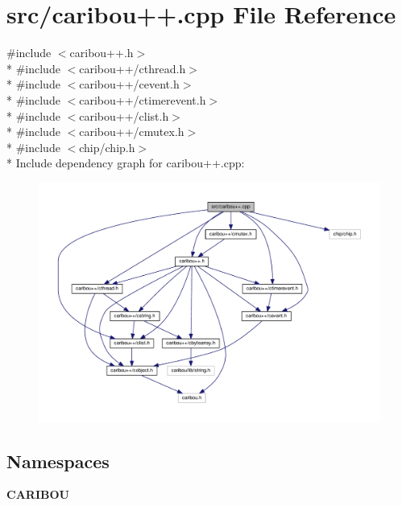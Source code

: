 \section{src/caribou++.cpp File Reference}
\label{caribou_09_09_8cpp}
{\ttfamily \#include $<$caribou++.\+h$>$}\\*
{\ttfamily \#include $<$caribou++/cthread.\+h$>$}\\*
{\ttfamily \#include $<$caribou++/cevent.\+h$>$}\\*
{\ttfamily \#include $<$caribou++/ctimerevent.\+h$>$}\\*
{\ttfamily \#include $<$caribou++/clist.\+h$>$}\\*
{\ttfamily \#include $<$caribou++/cmutex.\+h$>$}\\*
{\ttfamily \#include $<$chip/chip.\+h$>$}\\*
Include dependency graph for caribou++.cpp\+:
\nopagebreak
\begin{figure}[H]
\begin{center}
\leavevmode
\includegraphics[width=350pt]{caribou_09_09_8cpp__incl}
\end{center}
\end{figure}
\subsection*{Namespaces}
\begin{DoxyCompactItemize}
\item 
 {\bf C\+A\+R\+I\+B\+OU}
\end{DoxyCompactItemize}
